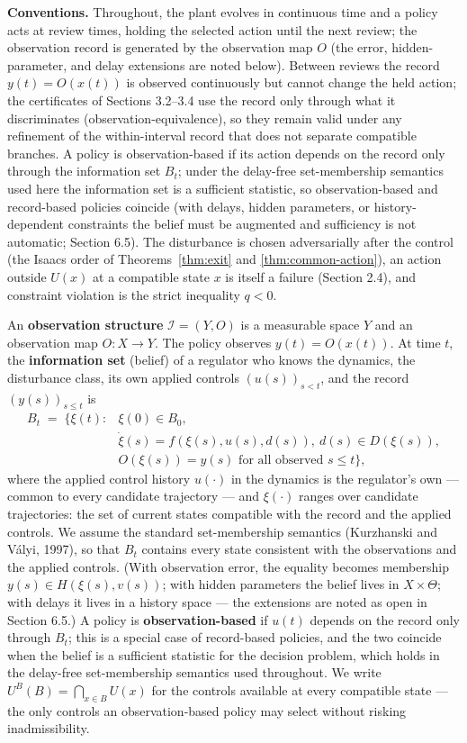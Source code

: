 \documentclass[10pt,twocolumn]{article}
\theoremstyle{definition}
\begin{document}
\textbf{Conventions.} Throughout, the plant evolves in continuous time
and a policy acts at review times, holding the selected action until the
next review; the observation record is generated by the observation map
\(O\) (the error, hidden-parameter, and delay extensions are noted
below). Between reviews the record \(y(t)=O(x(t))\) is observed
continuously but cannot change the held action; the certificates of
Sections 3.2--3.4 use the record only through what it discriminates
(observation-equivalence), so they remain valid under any refinement of
the within-interval record that does not separate compatible branches.
A policy is observation-based if its action depends on the
record only through the information set \(B_t\); under the delay-free
set-membership semantics used here the information set is a sufficient
statistic, so observation-based and record-based policies coincide (with
delays, hidden parameters, or history-dependent constraints the belief
must be augmented and sufficiency is not automatic; Section 6.5). The disturbance
is chosen adversarially after the control (the Isaacs order of
Theorems~\ref{thm:exit} and \ref{thm:common-action}), an action outside
\(U(x)\) at a compatible state \(x\) is itself a failure (Section 2.4),
and constraint violation is the strict inequality \(q<0\).

An \textbf{observation structure} \(\mathcal{I} = (Y, O)\) is a
measurable space \(Y\) and an observation map \(O : X \to Y\). The
policy observes \(y(t) = O(x(t))\). At time \(t\), the
\textbf{information set} (belief) of a regulator who knows the dynamics,
the disturbance class, its own applied controls \((u(s))_{s<t}\), and the record \((y(s))_{s \le t}\) is
\[
\begin{aligned}
B_t \;=\; \bigl\{ \xi(t) : {}& \xi(0) \in B_0,\\
& \dot\xi(s) = f(\xi(s), u(s), d(s)),\ d(s) \in D(\xi(s)),\\
& O(\xi(s)) = y(s) \text{ for all observed } s \le t \bigr\},
\end{aligned}
\]
where the applied control history \(u(\cdot)\) in the dynamics is
the regulator's own --- common to every candidate trajectory --- and
\(\xi(\cdot)\) ranges over candidate trajectories: the set of current
states compatible with the record and the applied controls. We assume the standard set-membership semantics (Kurzhanski and V\'alyi, 1997), so that \(B_t\) contains every state
consistent with the observations and the applied controls. (With
observation error, the equality becomes membership
\(y(s) \in H(\xi(s), v(s))\); with hidden parameters the belief lives in
\(X \times \Theta\); with delays it lives in a history space --- the extensions are noted as open in Section 6.5.) A policy is
\textbf{observation-based} if \(u(t)\) depends on the record only
through \(B_t\); this is a special case of record-based policies, and
the two coincide when the belief is a sufficient statistic for the
decision problem, which holds in the delay-free set-membership semantics used
throughout. We write \(U^B(B) = \bigcap_{x \in B} U(x)\) for the
controls available at every compatible state --- the only controls an
observation-based policy may select without risking inadmissibility.
\end{document}
